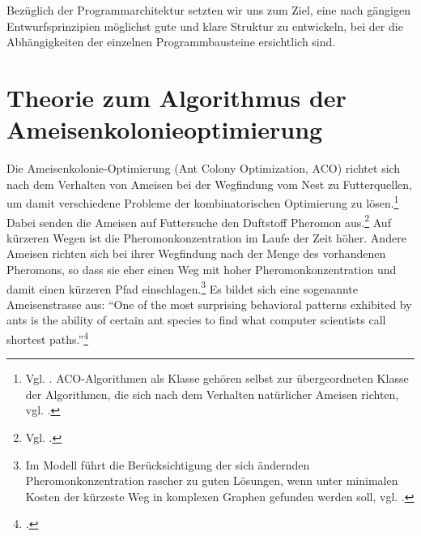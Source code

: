 Bezüglich der Programmarchitektur setzten wir uns zum Ziel, eine nach gängigen Entwurfsprinzipien möglichst gute und klare Struktur zu entwickeln, bei der die Abhängigkeiten der einzelnen Programmbausteine ersichtlich sind.



\section{Theorie zum Algorithmus der Ameisenkolonieoptimierung} 

Die Ameisenkolonie-Optimierung (Ant Colony Optimization, ACO) richtet sich nach dem Verhalten von Ameisen bei der Wegfindung vom Nest zu Futterquellen, um damit verschiedene Probleme der kombinatorischen Optimierung zu lösen.\footnote{Vgl. \citet*[S. 1]{sch-koa}. ACO-Algorithmen als Klasse gehören selbst zur übergeordneten Klasse der Algorithmen, die sich nach dem Verhalten natürlicher Ameisen richten, vgl. \citet*[S. 22]{ds-ant}.} Dabei senden die Ameisen auf Futtersuche den Duftstoff Pheromon aus.\footnote{Vgl. \citet*[S. 1\,ff.]{ds-ant}.} Auf kürzeren Wegen ist die Pheromonkonzentration im Laufe der Zeit höher. Andere Ameisen richten sich bei ihrer Wegfindung nach der Menge des vorhandenen Pheromons, so dass sie eher einen Weg mit hoher Pheromonkonzentration und damit einen kürzeren Pfad einschlagen.\footnote{Im Modell führt die Berücksichtigung der sich ändernden Pheromonkonzentration rascher zu guten Lösungen, wenn unter minimalen Kosten der kürzeste Weg in komplexen Graphen gefunden werden soll, vgl. \citet*[S. 9\,ff.; 22]{ds-ant}.} Es bildet sich eine sogenannte Ameisenstrasse aus: \enquote{One of the most surprising behavioral patterns exhibited by ants is the ability of certain ant species to find what computer scientists call shortest paths.}\footnote{\citet*[S. IX]{ds-ant}.}

